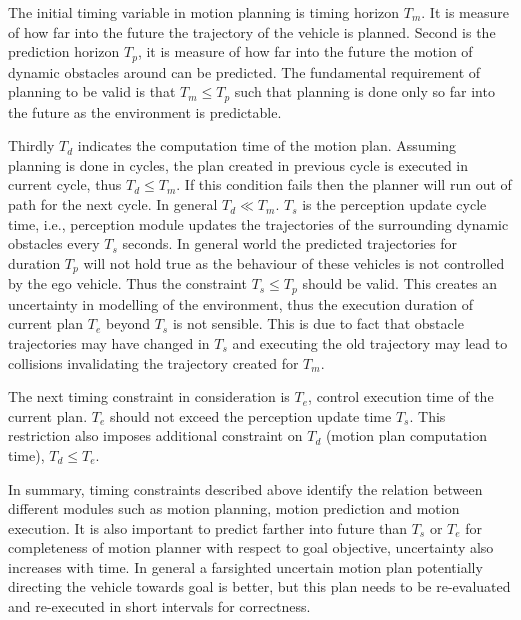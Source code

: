 The initial timing variable in motion planning is timing horizon $ T_m $. It is measure of how far into the future the trajectory of the vehicle is planned. Second is the prediction horizon $ T_p $, it is measure of how far into the future the motion of dynamic obstacles around can be predicted. The fundamental requirement of planning to be valid is that $ T_m  \le  T_p $ such that planning is done only so far into the future as the environment is predictable. 

Thirdly $ T_d $ indicates the computation time of the motion plan. Assuming planning is done in cycles, the plan created in previous cycle is executed in current cycle, thus $ T_d  \le  T_m $. If this condition fails then the planner will run out of path for the next cycle. In general $ T_d \ll T_m $. $ T_s $ is the perception update cycle time, i.e., perception module updates the trajectories of the surrounding dynamic obstacles every $ T_s $ seconds. In general world the predicted trajectories for duration $ T_p $ will not hold true as the behaviour of these vehicles is not controlled by the ego vehicle. Thus the constraint $ T_s  \le T_p $ should be valid. This creates an uncertainty in modelling of the environment, thus the execution duration of current plan $ T_e $ beyond $ T_s $ is not sensible. This is due to fact that obstacle trajectories may have changed in $ T_s $ and executing the old trajectory may lead to collisions invalidating the trajectory created for $ T_m $. 


The next timing constraint in consideration is $ T_e $, control execution time of the current plan. $ T_e $ should not exceed the perception update time $ T_s $. This restriction also imposes additional constraint on $ T_d $ (motion plan computation time), $ T_d \le T_e $. 

In summary, timing constraints described above identify the relation between different modules such as motion planning, motion prediction and motion execution. It is also important to predict farther into future than $T_s$ or  $T_e$ for completeness of motion planner with respect to goal objective, uncertainty also increases with time. In general a farsighted uncertain motion plan potentially directing the vehicle towards goal is better, but this plan needs to be re-evaluated and re-executed in short intervals for correctness. 



